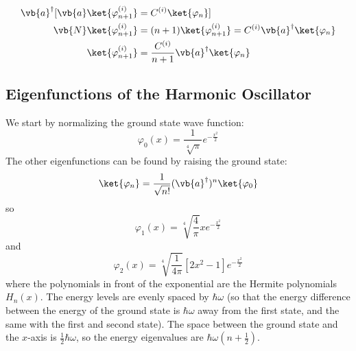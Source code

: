 \documentclass[a4paper,twoside,master.tex]{subfiles}
\begin{document}
\begin{align}
    \vb{a}^\dagger [ \vb{a} \ket{\varphi_{n+1}^{(i)}} &= C^{(i)} \ket{\varphi_{n}} ] \\
    \vb{N} \ket{\varphi_{n+1}^{(i)}} &= (n+1) \ket{\varphi_{n+1}^{(i)}} = C^{(i)} \vb{a}^\dagger \ket{\varphi_{n}} \\
    \ket{\varphi_{n+1}^{(i)}} &= \frac{C^{(i)}}{n+1} \vb{a}^\dagger \ket{\varphi_{n}}
\end{align}

\subsection{Eigenfunctions of the Harmonic Oscillator}
\label{sub:eigenfunctions of the harmonic oscillator}
We start by normalizing the ground state wave function:
\begin{equation}
    \varphi_0(x) = \frac{1}{\sqrt[4]{\pi}} e^{- \frac{x^2}{2}}
\end{equation}
The other eigenfunctions can be found by raising the ground state:
\begin{equation}
    \ket{\varphi_{n}} = \frac{1}{\sqrt{n!}} (\vb{a}^\dagger)^n \ket{\varphi_0}
\end{equation}
so
\begin{equation}
    \varphi_{1}(x) = \sqrt[4]{\frac{4}{\pi}} x e^{- \frac{x^2}{2}}
\end{equation}
and
\begin{equation}
    \varphi_{2}(x) = \sqrt[4]{\frac{1}{4 \pi}} \left[ 2 x^2 - 1 \right] e^{- \frac{x^2}{2}}
\end{equation}
where the polynomials in front of the exponential are the Hermite polynomials $ H_n(x) $. The energy levels are evenly spaced by $ \hbar \omega $ (so that the energy difference between the energy of the ground state is $ \hbar \omega $ away from the first state, and the same with the first and second state). The space between the ground state and the $ x $-axis is $ \frac{1}{2} \hbar \omega $, so the energy eigenvalues are $ \hbar \omega (n + \frac{1}{2}) $.
\end{document}
